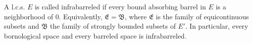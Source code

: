 A l.c.s. $E$ is called infrabarreled if every bound absorbing barrel in $E$ is a neighborhood of 0. Equivalently, $\mathfrak{E} = \mathfrak{B}$, where $\mathfrak{E}$ is the family of equicontinuous subsets and $\mathfrak{B}$ the family of strongly bounded subsets of $E'$. In particular, every bornological space and every barreled space is infrabarreled.
